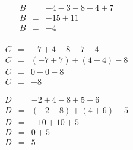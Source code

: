\begin{myexs}
\begin{multicols}{2}
{			
			\begin{eqnarray*}
				B &=& -4  -3  -8  +4  +7 \\
				B &=& -15 + 11 \\
				B &=& -4 \\
			\end{eqnarray*}
			
			\begin{eqnarray*}
				C &=& - 7 + 4 - 8 + 7 - 4 \\
				C &=& (- 7 + 7) + (4 - 4) - 8  \\
				C &=& 0 + 0 - 8 \\
				C &=& -8
			\end{eqnarray*}
			
			
			\begin{eqnarray*}
				D &=& -2 + 4 - 8 + 5 + 6 \\
				D &=& (- 2 - 8) + (4 + 6) + 5 \\
				D &=& -10 + 10 + 5 \\
				D &=& 0 + 5 \\
				D &=& 5
			\end{eqnarray*}
		}
		
	\end{multicols}
\end{myexs}